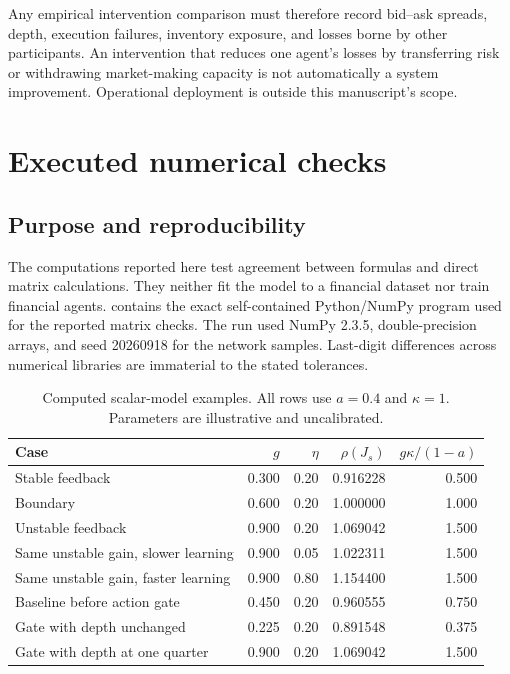 \documentclass[11pt,a4paper]{article}
\theoremstyle{definition}
\theoremstyle{remark}
\begin{document}
Any empirical intervention comparison must therefore record bid--ask spreads, depth, execution failures, inventory exposure, and losses borne by other participants. An intervention that reduces one agent's losses by transferring risk or withdrawing market-making capacity is not automatically a system improvement. Operational deployment is outside this manuscript's scope.

\section{Executed numerical checks}
\label{sec:checks}
\subsection{Purpose and reproducibility}
The computations reported here test agreement between formulas and direct matrix calculations. They neither fit the model to a financial dataset nor train financial agents.  contains the exact self-contained Python/NumPy program used for the reported matrix checks. The run used NumPy 2.3.5, double-precision arrays, and seed 20260918 for the network samples. Last-digit differences across numerical libraries are immaterial to the stated tolerances.

\begin{table}[htbp]
\centering\small
\caption{Computed scalar-model examples. All rows use $a=0.4$ and $\kappa=1$. Parameters are illustrative and uncalibrated.}
\label{tab:scalar}
\begin{tabularx}{\textwidth}{Yrrrr}
\toprule
Case & $g$ & $\eta$ & $\rho(J_s)$ & $g\kappa/(1-a)$\\
\midrule
Stable feedback & 0.300 & 0.20 & 0.916228 & 0.500\\
Boundary & 0.600 & 0.20 & 1.000000 & 1.000\\
Unstable feedback & 0.900 & 0.20 & 1.069042 & 1.500\\
Same unstable gain, slower learning & 0.900 & 0.05 & 1.022311 & 1.500\\
Same unstable gain, faster learning & 0.900 & 0.80 & 1.154400 & 1.500\\
Baseline before action gate & 0.450 & 0.20 & 0.960555 & 0.750\\
Gate with depth unchanged & 0.225 & 0.20 & 0.891548 & 0.375\\
Gate with depth at one quarter & 0.900 & 0.20 & 1.069042 & 1.500\\
\bottomrule
\end{tabularx}
\end{table}
\end{document}
